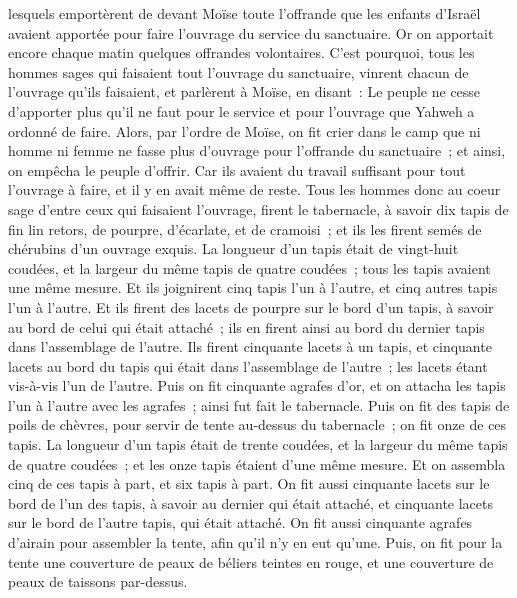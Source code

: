 \begin{multicols}{2}
lesquels emportèrent de devant Moïse toute l'offrande que les enfants d'Israël avaient apportée pour faire l'ouvrage du service du sanctuaire. Or on apportait encore chaque matin quelques offrandes volontaires.
C'est pourquoi, tous les hommes sages qui faisaient tout l'ouvrage du sanctuaire, vinrent chacun de l'ouvrage qu'ils faisaient,
et parlèrent à Moïse, en disant~: Le peuple ne cesse d'apporter plus qu'il ne faut pour le service et pour l'ouvrage que Yahweh a ordonné de faire.
Alors, par l'ordre de Moïse, on fit crier dans le camp que ni homme ni femme ne fasse plus d'ouvrage pour l'offrande du sanctuaire~; et ainsi, on empêcha le peuple d'offrir.
Car ils avaient du travail suffisant pour tout l'ouvrage à faire, et il y en avait même de reste.
Tous les hommes donc au coeur sage d'entre ceux qui faisaient l'ouvrage, firent le tabernacle, à savoir dix tapis de fin lin retors, de pourpre, d'écarlate, et de cramoisi~; et ils les firent semés de chérubins d'un ouvrage exquis.
La longueur d'un tapis était de vingt-huit coudées, et la largeur du même tapis de quatre coudées~; tous les tapis avaient une même mesure.
Et ils joignirent cinq tapis l'un à l'autre, et cinq autres tapis l'un à l'autre.
Et ils firent des lacets de pourpre sur le bord d'un tapis, à savoir au bord de celui qui était attaché~; ils en firent ainsi au bord du dernier tapis dans l'assemblage de l'autre.
Ils firent cinquante lacets à un tapis, et cinquante lacets au bord du tapis qui était dans l'assemblage de l'autre~; les lacets étant vis-à-vis l'un de l'autre.
Puis on fit cinquante agrafes d'or, et on attacha les tapis l'un à l'autre avec les agrafes~; ainsi fut fait le tabernacle.
Puis on fit des tapis de poils de chèvres, pour servir de tente au-dessus du tabernacle~; on fit onze de ces tapis.
La longueur d'un tapis était de trente coudées, et la largeur du même tapis de quatre coudées~; et les onze tapis étaient d'une même mesure.
Et on assembla cinq de ces tapis à part, et six tapis à part.
On fit aussi cinquante lacets sur le bord de l'un des tapis, à savoir au dernier qui était attaché, et cinquante lacets sur le bord de l'autre tapis, qui était attaché.
On fit aussi cinquante agrafes d'airain pour assembler la tente, afin qu'il n'y en eut qu'une.
Puis, on fit pour la tente une couverture de peaux de béliers teintes en rouge, et une couverture de peaux de taissons par-dessus.

\end{multicols}
